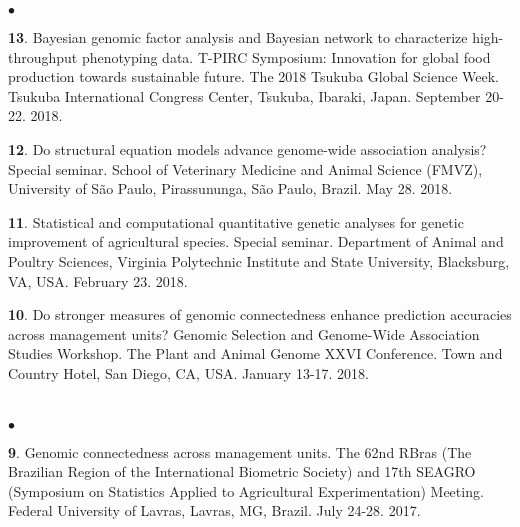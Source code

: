 \documentclass[margin,line,10pt]{res}
\newenvironment{list2}{
  \begin{list}{$\bullet$}{%
      \setlength{\itemsep}{0in}
      \setlength{\parsep}{0in} \setlength{\parskip}{0in}
      \setlength{\topsep}{0in} \setlength{\partopsep}{0in} 
      \setlength{\leftmargin}{0.2in}}}{\end{list}}
\begin{document}
\begin{resume}
\begin{list2}
  
  \vspace{0.5cm}
  
\item [{\bf 13}.] Bayesian genomic factor analysis and Bayesian network to characterize high-throughput phenotyping data. T-PIRC Symposium: Innovation for global food production towards sustainable future. The 2018 Tsukuba Global Science Week. Tsukuba International Congress Center, Tsukuba, Ibaraki, Japan. September 20-22. 2018.
  

  \vspace{0.5cm}
  
  
\item [{\bf 12}.] Do structural equation models advance genome-wide association analysis? Special seminar. School of Veterinary Medicine and Animal Science (FMVZ), University of S\~{a}o Paulo, Pirassununga, S\~{a}o Paulo, Brazil.  May 28. 2018.

    \vspace{0.5cm}
    
\item [{\bf 11}.]  Statistical and computational quantitative genetic analyses for genetic improvement of agricultural species. Special seminar.  Department of Animal and Poultry Sciences, Virginia Polytechnic Institute and State University, Blacksburg, VA, USA. February 23. 2018.

  \vspace{0.5cm}
  
\item [{\bf 10}.] Do stronger measures of genomic connectedness enhance prediction accuracies across management units?  Genomic Selection and Genome-Wide Association Studies Workshop. The Plant and Animal Genome XXVI Conference. Town and Country Hotel, San Diego, CA, USA. January 13-17. 2018. 
  
\end{list2}


\section{}
\begin{list2}
\item [{\bf 9}.] Genomic connectedness across management units. The 62nd RBras (The Brazilian Region of the International Biometric Society) and 17th SEAGRO (Symposium on Statistics Applied to Agricultural Experimentation) Meeting. Federal University of Lavras, Lavras, MG, Brazil. July 24-28. 2017.
  

\end{list2}
\end{resume}
\end{document}
